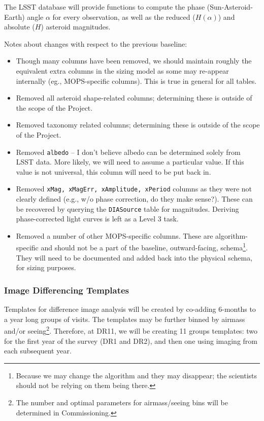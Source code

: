 \documentclass[12pt]{article}
\newcommand{\code}[1]{\texttt{#1}}
\newcommand{\DIASource}{\code{DIASource}\xspace}
\begin{document}
The LSST database will provide functions to compute the phase (Sun-Asteroid-Earth) angle $\alpha$ for every observation, as well as the reduced ($H(\alpha)$) and absolute ($H$) asteroid magnitudes.

\begin{changelog}
Notes about changes with respect to the previous baseline:
\begin{itemize}
\item Though many columns have been removed, we should maintain roughly the equivalent extra columns in the sizing model as some may re-appear internally (eg., MOPS-specific columns). This is true in general for all tables.
\item Removed all asteroid shape-related columns; determining these is outside of the scope of the Project.
\item Removed taxonomy related columns; determining these is outside of the scope of the Project.
\item Removed \texttt{albedo} -- I don't believe albedo can be determined solely from LSST data. More likely, we will need to assume a particular value. If this value is not universal, this column will need to be put back in.
\item Removed \texttt{xMag, xMagErr, xAmplitude, xPeriod} columns as they were not clearly defined (e.g., w/o phase correction, do they make sense?). These can be recovered by querying the \DIASource table for magnitudes. Deriving phase-corrected light curves is left as a Level 3 task.
\item Removed a number of other MOPS-specific columns. These are algorithm-specific and should not be a part of the baseline, outward-facing, schema\footnote{Because we may change the algorithm and they may disappear; the scientists should not be relying on them being there.}. They will need to be documented and added back into the physical schema, for sizing purposes.
\end{itemize}
\end{changelog}

\subsubsection{Image Differencing Templates}
\label{sec:templates}

Templates for difference image analysis will be created by co-adding 6-months to a year long groups of visits. The templates may be further binned by airmass and/or seeing\footnote{The number and optimal parameters for airmass/seeing bins will be determined in Commissioning.}. Therefore, at DR11, we will be creating 11 groups templates: two for the first year of the survey (DR1 and DR2), and then one using imaging from each subsequent year.
\end{document}

